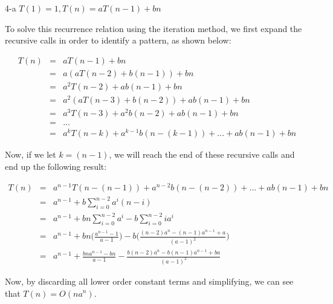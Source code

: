 \documentclass[11pt]{article}
\begin{document}
\begin{prob}{4-a}
$T(1) = 1, T(n) = aT(n-1) + bn$
\end{prob}
\begin{sol} 

To solve this recurrence relation using the iteration method, we first expand the recursive calls in order to identify a pattern, as shown below:

\begin{eqnarray*}
T(n) & = & aT(n-1) + bn \\
& = & a(aT(n-2) + b(n-1)) + bn \\
& = & a^2T(n-2) + ab(n-1) + bn\\
& = & a^2(aT(n-3) + b(n-2)) + ab(n-1) + bn\\
& = & a^3T(n-3) + a^2b(n-2) + ab(n-1) + bn \\
& = & ... \\
& = & a^kT(n-k) + a^{k-1}b(n-(k-1)) + ... + ab(n-1) + bn
\end{eqnarray*}

Now, if we let $k = (n-1)$, we will reach the end of these recursive calls and end up the following result:

\begin{eqnarray*}
T(n) & = & a^{n-1}T(n-(n-1)) + a^{n-2}b(n-(n-2)) + ... + ab(n-1) + bn \\
& = & a^{n-1} + b\sum_{i=0}^{n-2} a^i(n-i) \\
& = & a^{n-1} + bn\sum_{i=0}^{n-2} a^i - b\sum_{i=0}^{n-2} ia^i \\
& = & a^{n-1} + bn\Bigg(\frac{a^{n-1} - 1}{a-1}\Bigg) - b\Bigg(\frac{(n-2)a^{n} - (n-1)a^{n-1} + a}{(a-1)^2}\Bigg) \\
& = & a^{n-1} + \frac{bna^{n-1} - bn}{a-1} - \frac{b(n-2)a^{n} - b(n-1)a^{n-1} + ba}{(a-1)^2} 
\end{eqnarray*}

Now, by discarding all lower order constant terms and simplifying, we can see that $T(n) = O(na^n)$.

\begin{comment}
Now we make the observation that $a^n(\frac{1}{a})^{n-i} = a^{i}$, so we can re-write the summation above as $a^{n}\sum_{i=0}^{n-2} (\frac{1}{a})^{n-i}(n-i)$, which is the same as $a^{n}\Big((\sum_{i=0}^{n} i(\frac{1}{a})^i) - (\frac{1}{a})\Big)$. We now have the following:

\begin{eqnarray*}
T(n) & = & a^{n-1} + a^{n}b\Big((\sum_{i=0}^{n} i(\frac{1}{a})^i) - (\frac{1}{a})\Big)\\
& = & a^{n-1} + a^{n}b\Big(\frac{n(\frac{1}{a})^{n+2} - (n+1)(\frac{1}{a})^{n+1} + (\frac{1}{a})}{((\frac{1}{a}) - 1)^2} - (\frac{1}{a})\Big) \\
& = & a^{n-1} + \frac{a^{n}bn(\frac{1}{a})^{n+2} - a^{n}b(n+1)(\frac{1}{a})^{n+1} + a^{n}b(\frac{1}{a})}{((\frac{1}{a}) - 1)^2} - (\frac{1}{a}) \\
& = & a^{n-1} + \frac{bn(\frac{1}{a^2}) - b(n+1)(\frac{1}{a}) + a^{n - 1}b}{((\frac{1}{a}) - 1)^2} - (\frac{1}{a})
\end{eqnarray*}


\end{comment}
\end{sol}
\end{document}
